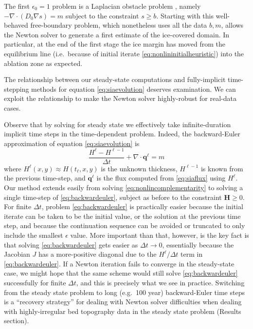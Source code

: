 \documentclass[twocolumn,letterpaper]{igs}
\newcommand\bq{\mathbf{q}}
\newcommand\bH{\mathbf{H}}
\newcommand{\Div}{\nabla\cdot}
\newcommand\eps{\epsilon}
\newcommand{\grad}{\nabla}
\begin{document}
The first $\eps_0=1$ problem is a Laplacian obstacle problem \citep{KinderlehrerStampacchia1980}, namely $-\Div(D_0 \grad s) = m$ subject to the constraint $s\ge b$.  Starting with this well-behaved free-boundary problem, which nonetheless uses all the data $b,m$, allows the Newton solver to generate a first estimate of the ice-covered domain.  In particular, at the end of the first stage the ice margin has moved from the equilibrium line (i.e.~because of initial iterate \eqref{eq:nonlininitialheuristic}) into the ablation zone as expected.

The relationship between our steady-state computations and fully-implicit time-stepping methods for equation \eqref{eq:siaevolution} deserves examination.  We can exploit the relationship to make the Newton solver highly-robust for real-data cases.

Observe that by solving for steady state we effectively take infinite-duration implicit time steps in the time-dependent problem.  Indeed, the backward-Euler \citep{MortonMayers2005} approximation of equation \eqref{eq:siaevolution} is
\begin{equation}
\frac{H^\ell - H^{\ell-1}}{\Delta t} + \Div \bq^\ell = m \label{eq:backwardeuler}
\end{equation}
where $H^\ell(x,y) \approx H(t_\ell,x,y)$ is the unknown thickness, $H^{\ell-1}$ is known from the previous time-step, and $\bq^\ell$ is the flux computed from \eqref{eq:siaflux} using $H^\ell$.  Our method extends easily from solving \eqref{eq:nonlincomplementarity} to solving a single time-step of \eqref{eq:backwardeuler}, subject as before to the constraint $\bH\ge 0$.  For finite $\Delta t$, problem \eqref{eq:backwardeuler} is practically easier because the initial iterate can be taken to be the initial value, or the solution at the previous time step, and because the continuation sequence can be avoided or truncated to only include the smallest $\eps$ value.  More important than that, however, is the key fact is that solving \eqref{eq:backwardeuler} gets easier as $\Delta t\to 0$, essentially because the Jacobian $J$ has a more-positive diagonal due to the $H^\ell/\Delta t$ term in \eqref{eq:backwardeuler}.  If a Newton iteration fails to converge in the steady-state case, we might hope that the same scheme would still solve \eqref{eq:backwardeuler} successfully for finite $\Delta t$, and this is precisely what we see in practice.  Switching from the steady state problem to long (e.g.~100 year) backward-Euler time steps is a ``recovery strategy'' for dealing with Newton solver difficulties when dealing with highly-irregular bed topography data in the steady state problem (Results section).
\end{document}
